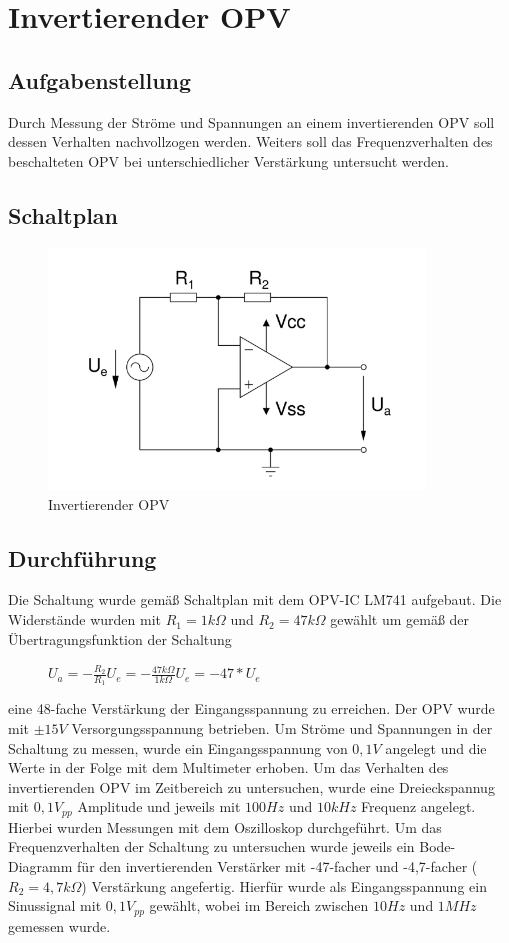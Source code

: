 \documentclass[12pt,a4paper,titlepage]{article}
\begin{document}
\newpage

\section{Invertierender OPV}

\subsection*{Aufgabenstellung}
Durch Messung der Ströme und Spannungen an einem invertierenden OPV soll dessen Verhalten nachvollzogen werden. Weiters soll das Frequenzverhalten des beschalteten OPV bei unterschiedlicher Verstärkung untersucht werden.

\subsection*{Schaltplan}
\begin{figure}[H]
  \centering
  \includegraphics[width=100mm]{i_opv_schaltung.png}
  \caption{Invertierender OPV}
\end{figure}

\subsection*{Durchf\"uhrung}
Die Schaltung wurde gemäß Schaltplan mit dem OPV-IC LM741 aufgebaut. Die Widerstände wurden mit $R_1 = 1k\Omega$ und $R_2 = 47k\Omega$ gewählt um gemäß der Übertragungsfunktion der Schaltung

\begin{figure}[H]
  \centering
  $U_a = -\frac{R_2}{R_1}U_e = -\frac{47k\Omega}{1k\Omega}U_e = -47*U_e$
\end{figure}

\noindent eine 48-fache Verstärkung der Eingangsspannung zu erreichen. Der OPV wurde mit $\pm 15V$ Versorgungsspannung betrieben. Um Ströme und Spannungen in der Schaltung zu messen, wurde ein Eingangsspannung von $0,1V$ angelegt und die Werte in der Folge mit dem Multimeter erhoben. Um das Verhalten des invertierenden OPV im Zeitbereich zu untersuchen, wurde eine Dreieckspannug mit $0,1V_{pp}$ Amplitude und jeweils mit $100Hz$ und $10kHz$ Frequenz angelegt. Hierbei wurden Messungen mit dem Oszilloskop durchgeführt. Um das Frequenzverhalten der Schaltung zu untersuchen wurde jeweils ein Bode-Diagramm für den invertierenden Verstärker mit -47-facher und -4,7-facher ($R_2=4,7k\Omega$) Verstärkung angefertig. Hierfür wurde als Eingangsspannung ein Sinussignal mit $0,1V_{pp}$ gewählt, wobei im Bereich zwischen $10Hz$ und $1MHz$ gemessen wurde.
\end{document}
